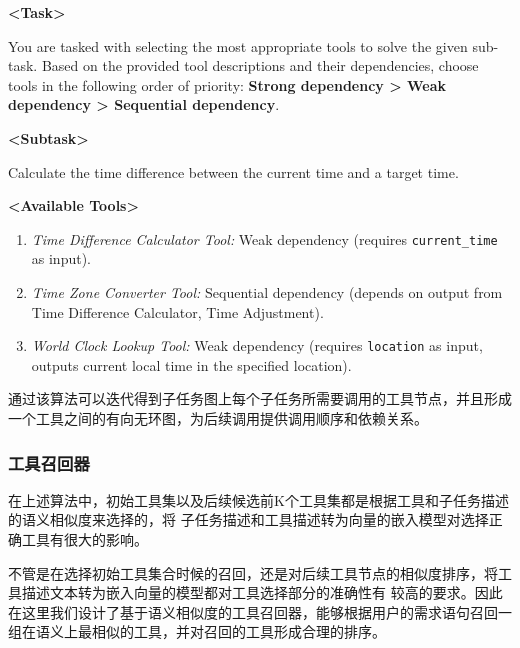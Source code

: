 \begin{table}[htbp]
  \centering
  \label{tab:tool-selection} %
  
\begin{tcolorbox}[colback=bgcolor, colframe=black, width=0.95\textwidth, boxrule=0.5mm, coltitle=white, colbacktitle=titlecolor, title=Example Prompt for Tool Selection]

\textbf{<Task>}

You are tasked with selecting the most appropriate tools to solve the given sub-task. Based on the provided tool descriptions and their dependencies, choose tools in the following order of priority: \textbf{Strong dependency > Weak dependency > Sequential dependency}. 

\textbf{<Subtask>}

Calculate the time difference between the current time and a target time.

\textbf{<Available Tools>}
\begin{enumerate}
    \item \textit{Time Difference Calculator Tool:} Weak dependency (requires \texttt{current\_time} as input).
    \item \textit{Time Zone Converter Tool:} Sequential dependency (depends on output from Time Difference Calculator, Time Adjustment).
    \item \textit{World Clock Lookup Tool:} Weak dependency (requires \texttt{location} as input, outputs current local time in the specified location).
\end{enumerate}

\end{tcolorbox}
\end{table}

通过该算法可以迭代得到子任务图上每个子任务所需要调用的工具节点，并且形成一个工具之间的有向无环图，为后续调用提供调用顺序和依赖关系。

\subsubsection{工具召回器}

在上述算法中，初始工具集以及后续候选前K个工具集都是根据工具和子任务描述的语义相似度来选择的，将
子任务描述和工具描述转为向量的嵌入模型对选择正确工具有很大的影响。

不管是在选择初始工具集合时候的召回，还是对后续工具节点的相似度排序，将工具描述文本转为嵌入向量的模型都对工具选择部分的准确性有
较高的要求。因此在这里我们设计了基于语义相似度的工具召回器，能够根据用户的需求语句召回一组在语义上最相似的工具，并对召回的工具形成合理的排序。

